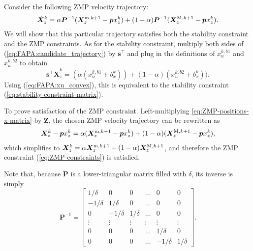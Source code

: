 Consider the following ZMP velocity trajectory:
\begin{equation}\label{eq:FAPA:candidate_trajectory}
\dot{\bm{X}}_z^k = \alpha \bm{P}^{-1}(\bm{X}_z^{{\rm m}, k+1} - \bm{p} x_z^k) + (1-\alpha)\bm{P}^{-1}(\bm{X}_z^{{\rm M}, k+1} - \bm{p} x_z^k).
\end{equation}
We will show that this particular trajectory satisfies both the stability
constraint and the ZMP constraints. As for the stability constraint, multiply
both sides of (\ref{eq:FAPA:candidate_trajectory}) by $\bm{s}^\top$
and plug in the definitions of $x_u^{k,b1}$ and $x_u^{k,b2}$ to obtain
\begin{equation*}
\bm{s}^\top\dot{\bm X}_z^k = (\alpha (x_u^{k,b1} + b^k_x)) + (1-\alpha)(x_u^{k,b2} + b^k_x)).
\end{equation*}
Using (\ref{eq:FAPA:xu_convex}), this is equivalent to the stability
constraint (\ref{eq:stability-constraint-matrix}).

To prove satisfaction of the ZMP constraint. Left-multiplying
\eqref{eq:ZMP-positions-x-matrix} by $\bm{Z}$, the chosen ZMP velocity
trajectory can be rewritten as
\begin{equation*}
\bm{X}_z^k - \bm{p} x_z^k = \alpha (\bm{X}_z^{{\rm m}, k+1} - \bm{p} x_z^k) + (1-\alpha)(\bm{X}_z^{{\rm M}, k+1} - \bm{p} x_z^k),
\end{equation*}
which simplifies to
$\bm{X}_z^k = \alpha \bm{X}_z^{{\rm m}, k+1} + (1-\alpha)\bm{X}_z^{{\rm M}, k+1}$,
and therefore the ZMP constraint (\ref{eq:ZMP-constraints}) is satisfied.
\hfill\bull

Note that, because $\bm{P}$ is a lower-triangular matrix filled with $\delta$,
its inverse is simply
\begin{equation*}
    \bm{P}^{-1}
    =
    \begin{bmatrix}
         1/\delta &         0 &        0 &  \dots &         0 &        0 \\
        -1/\delta &  1/\delta &        0 &  \dots &         0 &        0 \\
                0 & -1/\delta & 1/\delta &  \dots &         0 &        0 \\
           \vdots &    \vdots &   \vdots & \vdots &    \vdots &   \vdots \\
                0 &         0 &        0 &  \dots &  1/\delta &        0 \\
                0 &         0 &        0 &  \dots & -1/\delta & 1/\delta
    \end{bmatrix}.
\end{equation*}

